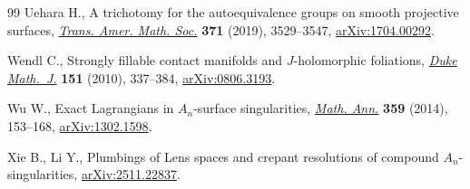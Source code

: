 \documentclass[pdftex]{sigma}
\theoremstyle{definition}
\numberwithin{equation}{section}
\begin{document}
\begin{thebibliography}{99}
Uehara H., A trichotomy for the autoequivalence groups on smooth projective
 surfaces, \href{https://doi.org/10.1090/tran/7439}{\textit{Trans. Amer. Math.
 Soc.}} \textbf{371} (2019), 3529--3547, \href{http://arxiv.org/abs/1704.00292}{arXiv:1704.00292}.

Wendl C., Strongly fillable contact manifolds and {$J$}-holomorphic foliations,
 \href{https://doi.org/10.1215/00127094-2010-001}{\textit{Duke Math.~J.}}
 \textbf{151} (2010), 337--384, \href{http://arxiv.org/abs/0806.3193}{arXiv:0806.3193}.

Wu W., Exact {L}agrangians in {$A_n$}-surface singularities,
 \href{https://doi.org/10.1007/s00208-013-0993-3}{\textit{Math. Ann.}}
 \textbf{359} (2014), 153--168,
 \href{http://arxiv.org/abs/1302.1598}{arXiv:1302.1598}.

Xie B., Li Y., Plumbings of {L}ens spaces and crepant resolutions of compound
 {${A}_n$}-singularities,
 \href{http://arxiv.org/abs/2511.22837}{arXiv:2511.22837}.

\end{thebibliography}\LastPageEnding
\end{document}
